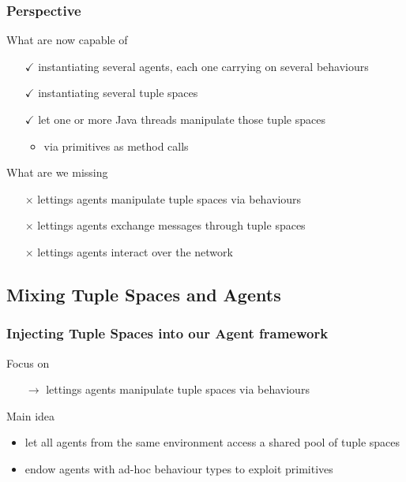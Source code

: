 \documentclass[presentation]{beamer}\mode<presentation>{\usetheme{AMSCesenaPurpleAndGold}}
\begin{document}
\begin{frame}
\frametitle{Perspective}

	\begin{block}{What are now capable of}
		\begin{itemize}
			\item[$\checkmark$] instantiating several \alert{agents}, each one carrying on several \alert{behaviours}
			\item[$\checkmark$] instantiating several \alert{tuple spaces}
			\item[$\checkmark$] let one or more \alert{Java threads} manipulate those tuple spaces 
			\begin{itemize}
				\item via \linda{} primitives as method calls
			\end{itemize}
		\end{itemize}
	\end{block}

	\vfill
	
	\begin{alertblock}{What are we missing}
		\begin{itemize}
			\item[$\times$] lettings agents manipulate tuple spaces \alert{via behaviours}
			\item[$\times$] lettings agents \alert{exchange messages} through tuple spaces
			\item[$\times$] lettings agents \alert{interact} over the network
		\end{itemize}
	\end{alertblock}
	
\end{frame}

\subsection{Mixing Tuple Spaces and Agents}

\begin{frame}
	\frametitle{Injecting Tuple Spaces into our Agent framework}
	
	\begin{alertblock}{Focus on}
		\begin{itemize}
			\item[$\rightarrow$] lettings agents manipulate tuple spaces \alert{via behaviours}
		\end{itemize}
	\end{alertblock}
	
	\pause
	
	\begin{exampleblock}{Main idea}
		\begin{itemize}
			\item let all agents from the same environment access a \alert{shared} pool of tuple spaces
			\item endow agents with ad-hoc behaviour types to exploit \linda{} primitives
		\end{itemize}
	\end{exampleblock}
	
\end{frame}
\end{document}
